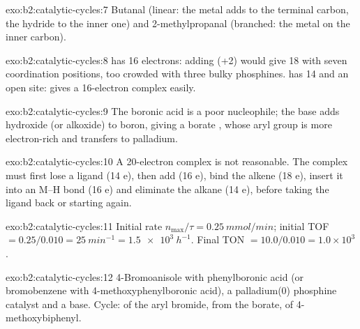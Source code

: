 \begin{solution}{exo:b2:catalytic-cycles:7}
Butanal  (linear: the metal adds to the terminal carbon, the hydride to
the inner one) and 2-methylpropanal  (branched: the metal on the inner
carbon).
\end{solution}

\begin{solution}{exo:b2:catalytic-cycles:8}
 has 16 electrons: adding  (+2) would give 18 with seven
coordination positions, too crowded with three bulky phosphines.  has 14
and an open site:  gives a 16-electron complex easily.
\end{solution}

\begin{solution}{exo:b2:catalytic-cycles:9}
The boronic acid is a poor nucleophile; the base adds hydroxide (or alkoxide) to boron,
giving a borate , whose aryl group is more electron-rich and transfers to
palladium.
\end{solution}

\begin{solution}{exo:b2:catalytic-cycles:10}
A 20-electron complex is not reasonable. The complex must first lose a ligand (14 e), then
add  (16 e), bind the alkene (18 e), insert it into an M--H bond (16 e) and eliminate the
alkane (14 e), before taking the ligand back or starting again.
\end{solution}

\begin{solution}{exo:b2:catalytic-cycles:11}
Initial rate $n_{\max}/\tau = \qty{0.25}{mmol/min}$; initial TOF $= 0.25/0.010 =
\qty{25}{min^{-1}} = \qty{1.5e3}{h^{-1}}$. Final TON $= 10.0/0.010 = 1.0 \times 10^3$.
\end{solution}

\begin{solution}{exo:b2:catalytic-cycles:12}
4-Bromoanisole with phenylboronic acid (or bromobenzene with 4-methoxyphenylboronic acid),
a palladium(0) phosphine catalyst and a base. Cycle:  of the
aryl bromide,  from the borate,  of
4-methoxybiphenyl.
\end{solution}

